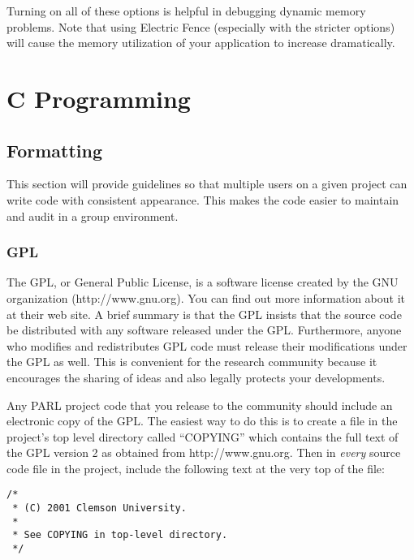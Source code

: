 \documentclass[11pt, letterpaper]{article}
\begin{document}
Turning on all of these options is helpful in debugging dynamic memory
problems.  Note that using Electric Fence (especially with the stricter
options) will cause the memory utilization of your application to
increase dramatically.



\section{C Programming}

\subsection{Formatting}

This section will provide guidelines so that multiple users on a given
project can write code with consistent appearance.  This makes the code
easier to maintain and audit in a group environment.

\subsubsection{GPL}

\label{sec:gpl}

The GPL, or General Public License, is a software license created by the
GNU organization (http://www.gnu.org).  You can find out more
information about it at their web site.  A brief summary is that the GPL
insists that the source code be distributed with any software released
under the GPL.  Furthermore, anyone who modifies and redistributes GPL
code must release their modifications under the GPL as well.  This is
convenient for the research community because it encourages the sharing
of ideas and also legally protects your developments.

Any PARL project code that you release to the community should include an electronic
copy of the GPL.  The easiest way to do this is to create a file in the
project's top level directory called ``COPYING'' which contains the full
text of the GPL version 2 as obtained from http://www.gnu.org.  Then in
\emph{every} source code file in the project, include the following text at
the very top of the file:

\begin{verbatim}
/*
 * (C) 2001 Clemson University.
 *
 * See COPYING in top-level directory.
 */       
\end{verbatim}
\end{document}
